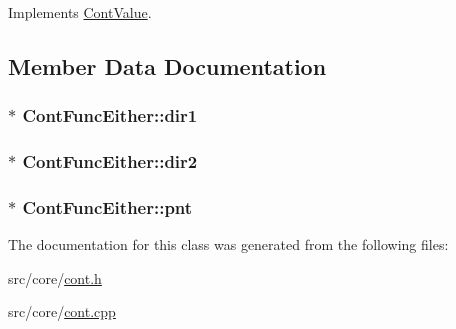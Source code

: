 Implements \hyperlink{a00086_ae3ce98084899bf1a873a1ec6bf15116e}{Cont\-Value}.



\subsection{Member Data Documentation}
\hypertarget{a00056_a34dc3d7f09ab0d1eeba98592e2b1ca71}{
\subsubsection[{dir1}]{$\ast$ Cont\-Func\-Either\-::dir1\hspace{0.3cm}{\ttfamily [private]}}}\label{a00056_a34dc3d7f09ab0d1eeba98592e2b1ca71}
\hypertarget{a00056_affc948c83c590f610d5c02230237d7fa}{
\subsubsection[{dir2}]{ $\ast$ Cont\-Func\-Either\-::dir2\hspace{0.3cm}{\ttfamily [private]}}}\label{a00056_affc948c83c590f610d5c02230237d7fa}
\hypertarget{a00056_a04b8c169797d08e1bbf9d21ecc1ec6d2}{
\subsubsection[{pnt}]{$\ast$ Cont\-Func\-Either\-::pnt\hspace{0.3cm}{\ttfamily [private]}}}\label{a00056_a04b8c169797d08e1bbf9d21ecc1ec6d2}


The documentation for this class was generated from the following files\-:\begin{DoxyCompactItemize}
\item 
src/core/\hyperlink{a00218}{cont.\-h}\item 
src/core/\hyperlink{a00217}{cont.\-cpp}\end{DoxyCompactItemize}
